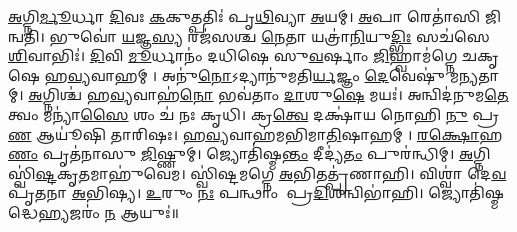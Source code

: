 \ul{𑌅}𑌗𑍍𑌨𑌿\ul{𑌰𑍍𑌮𑍂}𑌰𑍍𑌧𑌾 \ul{𑌦𑌿}𑌵𑌃 \ul{𑌕}𑌕𑍁𑌤𑍍𑌪𑌤𑌿𑌃॑ 𑌪𑍃\ul{𑌥𑌿}𑌵𑍍𑌯𑌾 \ul{𑌅}𑌯𑌮𑍍। \ul{𑌅}𑌪𑌾 𑌰𑍇𑌤𑌾॑𑌸𑌿 𑌜𑌿𑌨𑍍𑌵𑌤𑌿।
𑌭𑍁𑌵𑍋॑ \ul{𑌯}𑌜𑍍𑌞\ul{𑌸𑍍𑌯} 𑌰𑌜॑𑌸𑌶𑍍𑌚 \ul{𑌨𑍇}𑌤𑌾 𑌯𑌤𑍍𑌰𑌾॑\ul{𑌨𑌿}𑌯𑍁\ul{𑌦𑍍𑌭𑌿𑌃} 𑌸𑌚॑𑌸𑍇 \ul{𑌶𑌿}𑌵𑌾𑌭𑌿𑌃॑।
\ul{𑌦𑌿}𑌵𑌿 \ul{𑌮𑍂}𑌰𑍍𑌧𑌾𑌨𑌂॑ 𑌦𑌧𑌿𑌷𑍇 𑌸𑍁\ul{𑌵}𑌰𑍍\mbox{}𑌷𑌾𑌂 \ul{𑌜𑌿}𑌹𑍍𑌵𑌾𑌮॑𑌗𑍍𑌨𑍇 𑌚𑌕𑍃𑌷𑍇 𑌹\ul{𑌵𑍍𑌯}𑌵𑌾𑌹𑌮𑍍।
𑌅𑌨𑍁॑\ul{𑌨𑍋}𑌽𑌦𑍍𑌯𑌾𑌨𑍁॑𑌮𑌤𑌿\ul{𑌰𑍍𑌯}𑌜𑍍𑌞𑌂 \ul{𑌦𑍇}𑌵𑍇𑌷𑍁॑ 𑌮𑌨𑍍𑌯𑌤𑌾𑌮𑍍।
\ul{𑌅}𑌗𑍍𑌨𑌿𑌶𑍍𑌚॑ 𑌹\ul{𑌵𑍍𑌯}𑌵𑌾𑌹॑\ul{𑌨𑍋} 𑌭𑌵॑𑌤𑌾𑌂 \ul{𑌦𑌾}𑌶𑍁\ul{𑌷𑍇} 𑌮𑌯𑌃॑।
𑌅𑌨𑍍𑌵𑌿𑌦॑𑌨𑍁𑌮\ul{𑌤𑍇} 𑌤𑍍𑌵𑌂 𑌮𑌨𑍍𑌯𑌾॑\ul{𑌸𑍈} 𑌶𑌂 𑌚॑ 𑌨𑌃 𑌕𑍃𑌧𑌿।
𑌕𑍍𑌰\ul{𑌤𑍍𑌵𑍇} 𑌦𑌕𑍍𑌷𑌾॑𑌯 𑌨𑍋𑌹𑌿 \ul{𑌨𑍁} 𑌪𑍍𑌰\ul{𑌣} 𑌆𑌯𑍂॑𑌷𑌿 𑌤𑌾𑌰𑌿𑌷𑌃।
\ul{𑌹}\ul{𑌵𑍍𑌯}𑌵𑌾𑌹॑𑌮𑌭𑌿𑌮𑌾\ul{𑌤𑌿}𑌷𑌾𑌹𑌮𑍍। \ul{𑌰}\ul{𑌕𑍍𑌷𑍋}𑌹\ul{𑌣𑌂} 𑌪𑍃𑌤॑𑌨𑌾𑌸𑍁 \ul{𑌜𑌿}𑌷𑍍𑌣𑍁𑌮𑍍।
𑌜𑍍𑌯𑍋𑌤𑌿॑𑌷𑍍𑌮\ul{𑌨𑍍𑌤𑌂} 𑌦𑍀𑌦𑍍𑌯॑\ul{𑌤𑌂} 𑌪𑍁𑌰॑𑌨𑍍𑌧𑌿𑌮𑍍। \ul{𑌅}𑌗𑍍𑌨𑌿 𑌸𑍍𑌵𑌿॑\ul{𑌷𑍍𑌟}𑌕𑍃\ul{𑌤}𑌮𑌾𑌹𑍁॑𑌵𑍇𑌮।
𑌸𑍍𑌵𑌿॑𑌷𑍍𑌟𑌮𑌗𑍍𑌨𑍇 \ul{𑌅}𑌭𑌿𑌤𑌤𑍍𑌪𑍃॑𑌣𑌾𑌹𑌿। 𑌵𑌿𑌶𑍍𑌵𑌾॑ 𑌦𑍇\ul{𑌵} 𑌪𑍃॑𑌤𑌨𑌾 \ul{𑌅}𑌭𑌿𑌷𑍍𑌯।
\ul{𑌉}𑌰𑍁𑌂 \ul{𑌨𑌃} 𑌪𑌨𑍍𑌥𑌾𑌂 𑌪𑍍𑌰\ul{𑌦𑌿}𑌶𑌨𑍍𑌵𑌿𑌭𑌾॑𑌹𑌿। 𑌜𑍍𑌯𑍋𑌤𑌿॑𑌷𑍍𑌮𑌦𑍍𑌧𑍇\ul{𑌹𑍍𑌯}𑌜𑌰𑌂॑ \ul{𑌨} 𑌆𑌯𑍁𑌃॑॥

